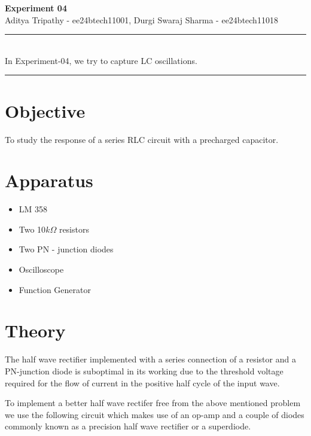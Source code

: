 \documentclass[a4paper,12pt]{article}
\renewenvironment{abstract}
 {\par\noindent\textbf{\abstractname}\ \ignorespaces \\}
 {\par\noindent\medskip}
\begin{document}
\pagestyle{fancy}
\thispagestyle{empty}
\fancyhead[L]{}
\renewcommand*{\thefootnote}{\fnsymbol{footnote}}
\begin{center}
\Large{\textbf{Experiment 04}}
\vspace{0.4cm}
\normalsize
\\ Aditya Tripathy - ee24btech11001, Durgi Swaraj Sharma - ee24btech11018\\
\medskip
\normalsize
\end{center}
{\color{gray}\hrule}
\vspace{0.4cm}
\begin{abstract}
In Experiment-04, we try to capture LC oscillations.
\end{abstract}
{\color{gray}\hrule}
\medskip
\section{Objective}
To study the response of a series RLC circuit with a precharged capacitor.

\section{Apparatus}
\begin{itemize}
\item LM 358
\item Two 10$k\Omega$ resistors
\item Two PN - junction diodes
\item Oscilloscope
\item Function Generator
\end{itemize}
\section{Theory}

The half wave rectifier implemented with a series connection of a resistor and a PN-junction diode is suboptimal in its working due to the threshold voltage required for the flow of current in the 
positive half cycle of the input wave. 

To implement a better half wave rectifer free from the above mentioned problem we use the following circuit which makes use of an op-amp and a couple of diodes commonly known as a precision half wave
rectifier or a superdiode.
\end{document}
